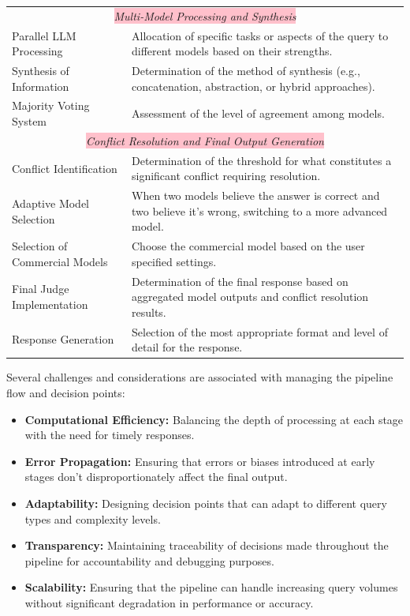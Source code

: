 \begin{table}[ht!]
{\begin{tabular}{lp{11cm}}
            \hline
            \multicolumn{2}{c}{\colorbox{pink}{\textit{Multi-Model Processing and Synthesis}}} \\
            Parallel LLM Processing & Allocation of specific tasks or aspects of the query to different models based on their strengths. \\
            Synthesis of Information & Determination of the method of synthesis (e.g., concatenation, abstraction, or hybrid approaches). \\
            Majority Voting System & Assessment of the level of agreement among models. \\
            \hline
            \multicolumn{2}{c}{\colorbox{pink}{\textit{Conflict Resolution and Final Output Generation}}} \\
            Conflict Identification & Determination of the threshold for what constitutes a significant conflict requiring resolution. \\
            Adaptive Model Selection & When two models believe the answer is correct and two believe it's wrong, switching to a more advanced model. \\
            Selection of Commercial Models & Choose the commercial model based on the user specified settings. \\
            Final Judge Implementation & Determination of the final response based on aggregated model outputs and conflict resolution results. \\
            Response Generation & Selection of the most appropriate format and level of detail for the response. \\
            \bottomrule
        \end{tabular}}
    \label{tab:pipeline-decision-points}
\end{table}

Several challenges and considerations are associated with managing the pipeline flow and decision points:
\begin{itemize}
    \item \textbf{Computational Efficiency:} Balancing the depth of processing at each stage with the need for timely responses.
    \item \textbf{Error Propagation:} Ensuring that errors or biases introduced at early stages don't disproportionately affect the final output.
    \item \textbf{Adaptability:} Designing decision points that can adapt to different query types and complexity levels.
    \item \textbf{Transparency:} Maintaining traceability of decisions made throughout the pipeline for accountability and debugging purposes.
    \item \textbf{Scalability:} Ensuring that the pipeline can handle increasing query volumes without significant degradation in performance or accuracy.
\end{itemize}

